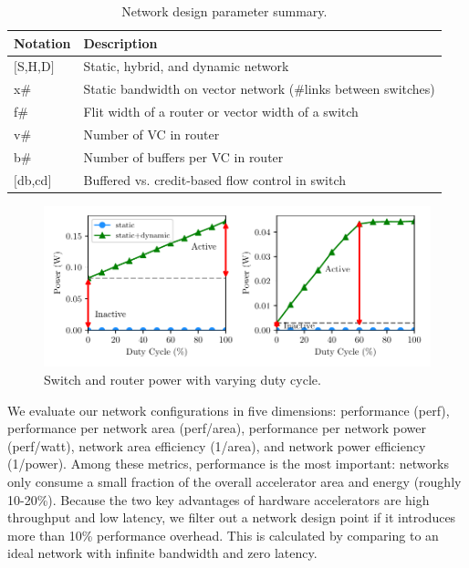 \begin{table}
\footnotesize
\begin{tabular*}{\columnwidth}{p{1cm} p{7cm}}
  \bottomrule
  \textbf{Notation} & \textbf{Description} \\\midrule
  $[$S,H,D$]$ & Static, hybrid, and dynamic network \\\midrule
  x\# & Static bandwidth on vector network (\#links between switches) \\\midrule
  f\# & Flit width of a router or vector width of a switch \\\midrule
  v\# & Number of VC in router \\\midrule
  b\# & Number of buffers per VC in router \\\midrule
  $[$db,cd$]$ & Buffered vs. credit-based flow control in switch \\\midrule
\end{tabular*}
\caption{Network design parameter summary.}
\label{tab:notation}
\end{table}
\begin{figure}
\centering
\includegraphics[width=1\columnwidth]{figs/sweep.pdf}
  \caption{Switch and router power with varying duty cycle.}\label{fig:sweep}
\end{figure}

We evaluate our network configurations in five dimensions: performance (perf), performance per network area (perf/area), performance per network
power (perf/watt), network area efficiency (1/area), and network power efficiency (1/power). 
Among these metrics, performance is the most important: networks only consume a small fraction of the overall accelerator area and energy (roughly 10-20\%). 
Because the two key advantages of hardware accelerators are high throughput and low latency, 
we filter out a network design point if it introduces
more than 10\% performance overhead.
This is calculated by comparing to an ideal network with infinite bandwidth and zero latency.

